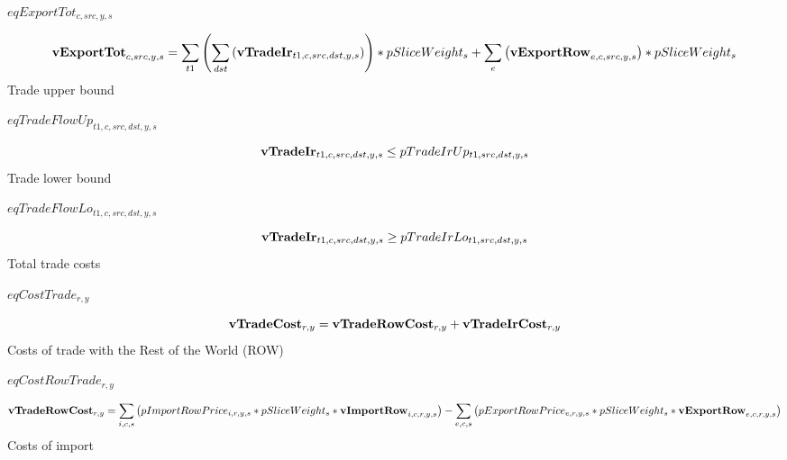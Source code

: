 \documentclass{article}
\begin{document}
$eqExportTot_{c,src,y,s}$





\begin{dmath} 
{\bf vExportTot}_{c,src,y,s}  =  \sum_{t1}{\left(\sum_{dst}{\left({\bf vTradeIr}_{t1,c,src,dst,y,s}\right)}\right)}*pSliceWeight_{s}+\sum_{e}{\left({\bf vExportRow}_{e,c,src,y,s}\right)}*pSliceWeight_{s}
\end{dmath} 
Trade upper bound







$eqTradeFlowUp_{t1,c,src,dst,y,s}$





\begin{dmath} 
{\bf vTradeIr}_{t1,c,src,dst,y,s}  \le  pTradeIrUp_{t1,src,dst,y,s}
\end{dmath} 
Trade lower bound







$eqTradeFlowLo_{t1,c,src,dst,y,s}$





\begin{dmath} 
{\bf vTradeIr}_{t1,c,src,dst,y,s}  \ge  pTradeIrLo_{t1,src,dst,y,s}
\end{dmath} 
Total trade costs







$eqCostTrade_{r,y}$





\begin{dmath} 
{\bf vTradeCost}_{r,y}  =  {\bf vTradeRowCost}_{r,y}+{\bf vTradeIrCost}_{r,y}
\end{dmath} 
Costs of trade with the Rest of the World (ROW)







$eqCostRowTrade_{r,y}$





\begin{dmath} 
{\bf vTradeRowCost}_{r,y}  =  \sum_{i,c,s}{\left(pImportRowPrice_{i,r,y,s}*pSliceWeight_{s}*{\bf vImportRow}_{i,c,r,y,s}\right)}-\sum_{e,c,s}{\left(pExportRowPrice_{e,r,y,s}*pSliceWeight_{s}*{\bf vExportRow}_{e,c,r,y,s}\right)}
\end{dmath} 
Costs of import
\end{document}
